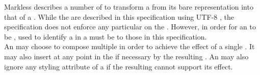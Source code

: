 Markless describes a number of  to transform a  from its bare  representation into that of a . While the  are described in this specification using UTF-8 , the specification does not enforce any particular  on the . However, in order for an  to be ,  used to identify a  in a  must be  to those in this specification. \\

An  may choose to compose multiple  in order to achieve the effect of a single . It may also insert  at any point in the  if necessary by the resulting . An  may also ignore any styling attribute of a  if the resulting cannot support its effect.

